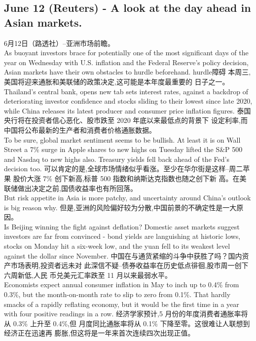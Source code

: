 \documentclass[a4paper,12pt]{article}
\begin{document}
\subsection{June 12 (Reuters) - A look at the day ahead in Asian markets.}
6月12日（路透社）--亚洲市场前瞻。
\\As buoyant investors brace for potentially one of the most significant days of the year on Wednesday with U.S. inflation and the Federal Reserve's policy decision, Asian markets have their own obstacles to hurdle beforehand.  hurdle障碍
本周三,美国将迎来通胀和美联储的政策决定,这可能是本年度最重要的 日子之一。 
\\Thailand's central bank, opens new tab sets interest rates, against a backdrop of deteriorating investor confidence and stocks sliding to their lowest since late 2020, while China releases its latest producer and consumer price inflation figures. 
泰国央行将在投资者信心恶化、股市跌至 2020 年底以来最低点的背景下 设定利率,而中国将公布最新的生产者和消费者价格通胀数据。 
\\To be sure, global market sentiment seems to be bullish. At least it is on Wall Street a 7\% surge in Apple shares to new highs on Tuesday lifted the S\&P 500 and Nasdaq to new highs also. Treasury yields fell back ahead of the Fed's decision too.  
可以肯定的是,全球市场情绪似乎看涨。至少在华尔街是这样--周二苹果 股价大涨 7\% 创下新高,标普 500 指数和纳斯达克指数也随之创下新 高。在美联储做出决定之前,国债收益率也有所回落。
\\But risk appetite in Asia is more patchy, and uncertainty around China's outlook is big reason why. 但是,亚洲的风险偏好较为分散,中国前景的不确定性是一大原因。 
\\Is Beijing winning the fight against deflation? Domestic asset markets suggest investors are far from convinced - bond yields are languishing at historic lows, stocks on Monday hit a six-week low, and the yuan fell to its weakest level against the dollar since November.  
中国在与通货紧缩的斗争中获胜了吗？国内资产市场表明,投资者远未对 此深信不疑--债券收益率在历史低点徘徊,股市周一创下六周新低,人民 币兑美元汇率跌至 11 月以来最弱水平。 
\\Economists expect annual consumer inflation in May to inch up to 0.4\% from 0.3\%, but the month-on-month rate to slip to zero from 0.1\%. That hardly smacks of a rapidly reflating economy, but it would be the first time in a year with four positive readings in a row. 
经济学家预计,5 月份的年度消费者通胀率将从 0.3\% 上升至 0.4\%,但 月度同比通胀率将从 0.1\% 下降至零。这很难让人联想到经济正在迅速再 膨胀,但这将是一年来首次连续四次出现正值。 
\end{document}
